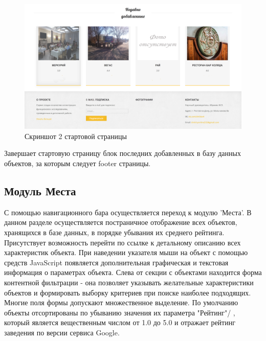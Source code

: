 \begin{figure}%
	\centering
	\includegraphics[width=\textwidth]{img/startpage3.png}
	\caption{\label{fig:tan-aus}Скриншот 2 стартовой страницы}
\end{figure}

Завершает стартовую страницу блок последних добавленных в базу данных объектов, за которым следует footer страницы.

\subsection{Модуль Места}

С помощью навигационного бара осуществляется переход к модулю 'Места'. В данном разделе осуществляется постраничное отображение всех объектов, хранящихся в базе данных, в порядке убывания их среднего рейтинга. Присутствует возможность перейти по ссылке к детальному описанию всех характеристик объекта. При наведении указателя мыши на объект с помощью средств JavaScript появляется дополнительная графическая и текстовая информация о параметрах объекта. Слева от секции с объектами находится форма контентной фильтрации - она позволяет указывать желательные характеристики объектов и формировать выборку критериев при поиске наиболее подходящих. Многие поля формы допускают множественное выделение. По умолчанию объекты отсортированы по убыванию значения их параметра "Рейтинг"/  , который является вещественным числом от 1.0 до 5.0 и отражает рейтинг заведения по версии сервиса Google. 

